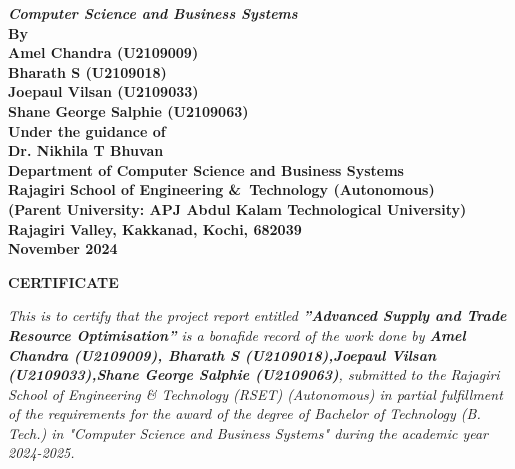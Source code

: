 \begin{center}
	{\Large \bf \itshape{{Computer Science and Business Systems}}}\\[1cm]
	\large \bfseries{By}\\[.2cm]
	\large \bfseries{Amel Chandra (U2109009)}\\[0.3cm]
	\large \bfseries{Bharath S (U2109018)}\\[0.3cm]
	\large \bfseries{Joepaul Vilsan (U2109033)}\\[0.3cm]
	\large \bfseries{Shane George Salphie (U2109063)}\\[0.3cm]
	\large \bfseries{Under the guidance of}\\[0.5cm]
	\large \bfseries{Dr. Nikhila T Bhuvan}\\[0.3cm]
	\large \textbf{Department of Computer Science and Business Systems}\\
	\large \textbf{Rajagiri School of Engineering \&\ Technology (Autonomous)}\\
	\small \bfseries{(Parent University: APJ Abdul Kalam Technological University)}\\
	\large \textbf{Rajagiri Valley, Kakkanad, Kochi, 682039}\\
	\large \bfseries{November 2024}
\end{center}

\newpage
\thispagestyle{empty}
\vspace{1cm}
\begin{center}

	\large \bfseries{\huge{CERTIFICATE}}\\[1cm]
\end{center}

\renewcommand{\baselinestretch}{1.2}\normalsize

\emph{This is to certify that the project report entitled \textbf{”Advanced Supply and Trade Resource Optimisation”} is a bonafide record of the work done by \textbf{Amel Chandra (U2109009), Bharath S (U2109018),Joepaul Vilsan (U2109033),Shane George Salphie (U2109063)}, submitted to the Rajagiri School of Engineering \& Technology (RSET) (Autonomous) in
	partial fulfillment of the requirements for the award of the degree of Bachelor of Technology (B. Tech.) in "Computer Science and Business Systems" during the academic year 2024-2025.}\\[2.5cm]

